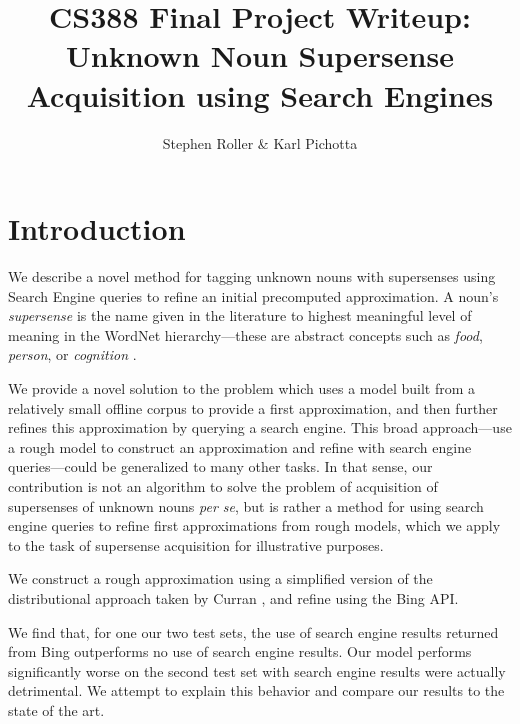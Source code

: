 \documentclass{article}
\title{CS388 Final Project Writeup:\\ 
Unknown Noun Supersense Acquisition using Search Engines}
\author{Stephen Roller \& Karl Pichotta}
\begin{document}
\maketitle




\section{Introduction}


We describe a novel method for tagging unknown nouns with supersenses using Search Engine queries to refine an initial precomputed approximation.
A noun's {\em supersense} is the name given in the literature to highest meaningful level of meaning in the WordNet \cite{wordnet} hierarchy---these are abstract concepts such as {\it food}, {\it person}, or {\it cognition} \cite{cj}.

We provide a novel solution to the problem which uses a model built from a relatively small offline corpus to provide a first approximation, and then further refines this approximation by querying a search engine.
This broad approach---use a rough model to construct an approximation and refine with search engine queries---could be generalized to many other tasks.
In that sense, our contribution is not an algorithm to solve the problem of acquisition of supersenses of unknown nouns {\it per se}, but is rather a method for using search engine queries to refine first approximations from rough models, which we apply to the task of supersense acquisition for illustrative purposes.

We construct a rough approximation using a simplified version of the distributional approach taken by Curran \cite{curran}, and refine using the Bing API.

We find that, for one our two test sets, the use of search engine results returned from Bing outperforms no use of search engine results.
Our model performs significantly worse on the second test set with search engine results were actually detrimental. We attempt to explain this behavior and compare our results to the state of the art.
\end{document}

